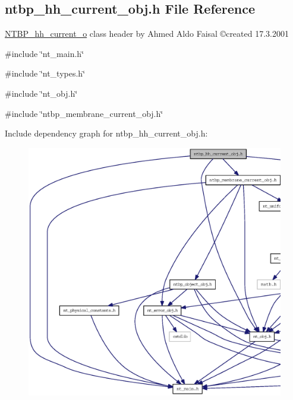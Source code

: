\subsection{ntbp\_\-hh\_\-current\_\-obj.h File Reference}
\label{ntbp__hh__current__obj_8h}



\begin{DoxyItemize}
\item \hyperlink{class_n_t_b_p__hh__current__o}{NTBP\_\-hh\_\-current\_\-o} class header by Ahmed Aldo Faisal \copyright created 17.3.2001 
\end{DoxyItemize} 


{\ttfamily \#include \char`\"{}nt\_\-main.h\char`\"{}}\par
{\ttfamily \#include \char`\"{}nt\_\-types.h\char`\"{}}\par
{\ttfamily \#include \char`\"{}nt\_\-obj.h\char`\"{}}\par
{\ttfamily \#include \char`\"{}ntbp\_\-membrane\_\-current\_\-obj.h\char`\"{}}\par
Include dependency graph for ntbp\_\-hh\_\-current\_\-obj.h:
\nopagebreak
\begin{figure}[H]
\begin{center}
\leavevmode
\includegraphics[width=400pt]{ntbp__hh__current__obj_8h__incl}
\end{center}
\end{figure}
